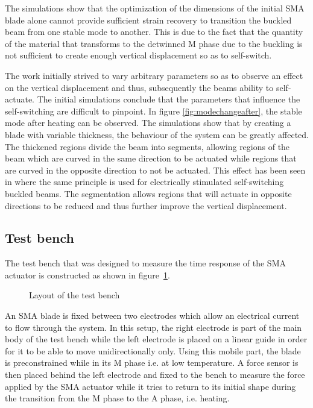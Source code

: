 The simulations show that the optimization of the dimensions of the initial SMA blade alone cannot provide sufficient strain recovery to transition the buckled beam from one stable mode to another. This is due to the fact that the quantity of the material that transforms to the detwinned M phase due to the buckling is not sufficient to create enough vertical displacement so as to self-switch.

The work initially strived to vary arbitrary parameters so as to observe an effect on the vertical displacement and thus, subsequently the beams ability to self-actuate. The initial simulations conclude that the parameters that influence the self-switching are difficult to pinpoint. In figure \ref{fig:modechangeafter}, the stable mode after heating can be observed. The simulations show that by creating a blade with variable thickness, the behaviour of the system can be greatly affected. The thickened regions divide the beam into segments, allowing regions of the beam which are curved in the same direction to be actuated while regions that are curved in the opposite direction to not be actuated. This effect has been seen in \cite{rossiter_self-switching_2006} where the same principle is used for electrically stimulated self-switching buckled beams. The segmentation allows regions that will actuate in opposite directions to be reduced and thus further improve the vertical displacement.

\subsection{Test bench}
The test bench that was designed to measure the time response of the SMA actuator is constructed as shown in figure~\ref{fig:test_bench}.
\begin{figure}[H]
	\centering
	\def\svgwidth{0.5\columnwidth}
	
	\caption{Layout of the test bench}
	\label{fig:test_bench}
\end{figure}

An SMA blade is fixed between two electrodes which allow an electrical current to flow through the system. In this setup, the right electrode is part of the main body of the test bench while the left electrode is placed on a linear guide in order for it to be able to move unidirectionally only. Using this mobile part, the blade is preconstrained while in its M phase i.e. at low temperature. A force sensor is then placed behind the left electrode and fixed to the bench to measure the force applied by the SMA actuator while it tries to return to its initial shape during the transition from the M phase to the A phase, i.e. heating.

